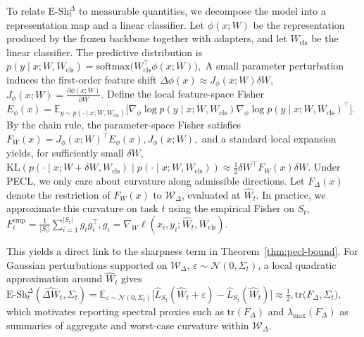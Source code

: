 \documentclass{article}
\theoremstyle{plain}
\theoremstyle{definition}
\theoremstyle{remark}
\begin{document}
To relate $\mathrm{E\text{-}Sh}_t^\Delta$ to measurable quantities, we decompose the model into a representation map and a linear classifier. Let $\phi(x;W)$ be the representation produced by the frozen backbone together with adapters, and let $W_{\mathrm{cls}}$ be the linear classifier. The predictive distribution is
$
p(y\mid x;W,W_{\mathrm{cls}})=
\mathrm{softmax}\bigl(W_{\mathrm{cls}}^\top \phi(x;W)\bigr),
$
A small parameter perturbation induces the first-order feature shift
$
\Delta \phi(x)\approx J_\phi(x;W)\delta W$,
$
J_\phi(x;W)=\frac{\partial \phi(x;W)}{\partial W}.
$
Define the local feature-space Fisher
$
E_\phi(x)=
\mathbb{E}_{y\sim p(\cdot\mid x;W,W_{\mathrm{cls}})}
\Big[
\nabla_\phi \log p(y\mid x;W,W_{\mathrm{cls}})
\nabla_\phi \log p(y\mid x;W,W_{\mathrm{cls}})^\top
\Big].
$
By the chain rule, the parameter-space Fisher satisfies
$
F_W(x)=J_\phi(x;W)^\top E_\phi(x),J_\phi(x;W),
$
and a standard local expansion yields, for sufficiently small $\delta W$,
$
\mathrm{KL}\left(
p(\cdot\mid x;W+\delta W,W_{\mathrm{cls}})
\middle|
p(\cdot\mid x;W,W_{\mathrm{cls}})
\right)
\approx
\frac{1}{2}\delta W^\top F_W(x)\delta W.
$
Under PECL, we only care about curvature along admissible directions. Let $F_\Delta(x)$ denote the restriction of $F_W(x)$ to $\mathcal{W}_\Delta$, evaluated at $\hat W_t$. In practice, we approximate this curvature on task $t$ using the empirical Fisher on $S_t$,
$
F^{\mathrm{emp}}_t
=
\frac{1}{|S_t|}\sum_{i=1}^{|S_t|} g_i g_i^\top,
g_i=\nabla_W \ell(x_i,y_i;\hat W_t,W_{\mathrm{cls}}).
$


This yields a direct link to the sharpness term in Theorem~\ref{thm:pecl-bound}. For Gaussian perturbations supported on $\mathcal{W}_\Delta$, $\varepsilon\sim\mathcal{N}(0,\Sigma_t)$, a local quadratic approximation around $\hat W_t$ gives
$
\mathrm{E\text{-}Sh}_t^\Delta(\hat{\Delta W}_t,\Sigma_t)=
\mathbb{E}_{\varepsilon\sim\mathcal{N}(0,\Sigma_t)}
\Big[
\hat{L}_{S_t}(\hat W_t+\varepsilon)-\hat{L}_{S_t}(\hat W_t)
\Big]
\approx
\frac{1}{2},\mathrm{tr}\bigl(F_\Delta,\Sigma_t\bigr),
$
which motivates reporting spectral proxies such as $\mathrm{tr}(F_\Delta)$ and $\lambda_{\max}(F_\Delta)$ as summaries of aggregate and worst-case curvature within $\mathcal{W}_\Delta$.
\end{document}
